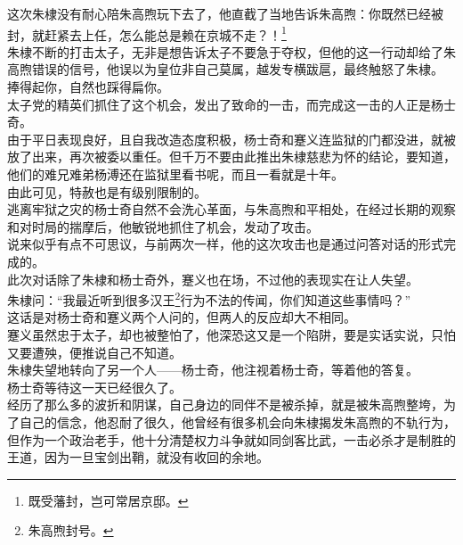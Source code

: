 \begin{multicols}{\theparacolNo}
这次朱棣没有耐心陪朱高煦玩下去了，他直截了当地告诉朱高煦：你既然已经被封，就赶紧去上任，怎么能总是赖在京城不走？！\footnote{既受藩封，岂可常居京邸。}\\

朱棣不断的打击太子，无非是想告诉太子不要急于夺权，但他的这一行动却给了朱高煦错误的信号，他误以为皇位非自己莫属，越发专横跋扈，最终触怒了朱棣。\\

捧得起你，自然也踩得扁你。\\

太子党的精英们抓住了这个机会，发出了致命的一击，而完成这一击的人正是杨士奇。\\

由于平日表现良好，且自我改造态度积极，杨士奇和蹇义连监狱的门都没进，就被放了出来，再次被委以重任。但千万不要由此推出朱棣慈悲为怀的结论，要知道，他们的难兄难弟杨溥还在监狱里看书呢，而且一看就是十年。\\

由此可见，特赦也是有级别限制的。\\

逃离牢狱之灾的杨士奇自然不会洗心革面，与朱高煦和平相处，在经过长期的观察和对时局的揣摩后，他敏锐地抓住了机会，发动了攻击。\\

说来似乎有点不可思议，与前两次一样，他的这次攻击也是通过问答对话的形式完成的。\\

此次对话除了朱棣和杨士奇外，蹇义也在场，不过他的表现实在让人失望。\\

朱棣问：“我最近听到很多汉王\footnote{朱高煦封号。}行为不法的传闻，你们知道这些事情吗？”\\

这话是对杨士奇和蹇义两个人问的，但两人的反应却大不相同。\\

蹇义虽然忠于太子，却也被整怕了，他深恐这又是一个陷阱，要是实话实说，只怕又要遭殃，便推说自己不知道。\\

朱棣失望地转向了另一个人——杨士奇，他注视着杨士奇，等着他的答复。\\

杨士奇等待这一天已经很久了。\\

经历了那么多的波折和阴谋，自己身边的同伴不是被杀掉，就是被朱高煦整垮，为了自己的信念，他忍耐了很久，他曾经有很多机会向朱棣揭发朱高煦的不轨行为，但作为一个政治老手，他十分清楚权力斗争就如同剑客比武，一击必杀才是制胜的王道，因为一旦宝剑出鞘，就没有收回的余地。\\


\end{multicols}
